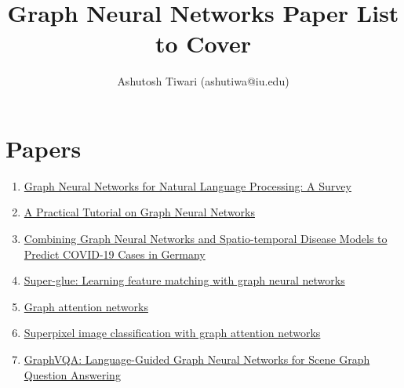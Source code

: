 \documentclass{article}
\title{\textbf{Graph Neural Networks Paper List to Cover}}
\author{{Ashutosh Tiwari (ashutiwa@iu.edu)}}
\begin{document}
\maketitle

\section{Papers}
\begin{enumerate}
    \item \href{https://arxiv.org/pdf/2106.06090.pdf}{Graph Neural Networks for Natural Language Processing: A Survey}
    \item \href{https://arxiv.org/pdf/2010.05234.pdf}{A Practical Tutorial on Graph Neural Networks}
    \item \href{https://arxiv.org/pdf/2101.00661.pdf}{Combining Graph Neural Networks and Spatio-temporal Disease Models to Predict COVID-19 Cases in Germany}
    \item \href{https://arxiv.org/pdf/1911.11763.pdf}{Super-glue: Learning feature matching with graph neural networks}
    \item \href{https://arxiv.org/pdf/1710.10903.pdf}{Graph attention networks}
    \item \href{https://arxiv.org/pdf/2002.05544.pdf}{Superpixel image classification with graph attention networks}
    \item \href{https://arxiv.org/pdf/2104.10283.pdf}{GraphVQA: Language-Guided Graph Neural Networks for Scene Graph Question Answering}

\end{enumerate}

\end{document}
